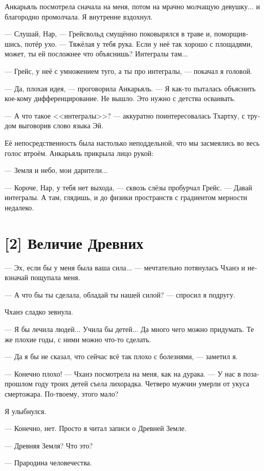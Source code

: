 \documentclass[a4paper,12pt,fleqn]{book}\usepackage{cooltooltips}\usepackage{polyglossia}\setdefaultlanguage[babelshorthands=true]{russian}\setotherlanguage{english}\defaultfontfeatures{Ligatures=TeX,Mapping=tex-text} \usepackage{xcolor}\definecolor{lightgray}{HTML}{bbbbbb}\color{lightgray}\newcommand{\ml}[3]{\textenglish{\textcolor{black}{#3}}}
\begin{document}
{Анкарьяль посмотрела сначала на меня, потом на мрачно молчащую девушку... и благородно промолчала.
Я внутренне вздохнул.

--- Слушай, Нар, --- Грейсвольд смущённо поковырялся в траве и, поморщившись, потёр ухо.
--- Тяжёлая у тебя рука.
Если у неё так хорошо с площадями, может, ты ей посложнее что объяснишь?
Интегралы там...

--- Грейс, у неё с умножением туго, а ты про интегралы, --- покачал я головой.

--- Да, плохая идея, --- проговорила Анкарьяль.
--- Я как-то пыталась объяснить кое-кому дифференцирование.
Не вышло.
Это нужно с детства осваивать.

--- А что такое <<интегралы>>? --- аккуратно поинтересовалась Тхартху, с трудом выговорив слово языка Эй.

Её непосредственность была настолько неподдельной, что мы засмеялись во весь голос втроём.
Анкарьяль прикрыла лицо рукой:

--- Земля и небо, мои дарители...

--- Короче, Нар, у тебя нет выхода, --- сквозь слёзы пробурчал Грейс.
--- Давай интегралы.
А там, глядишь, и до физики пространств с градиентом мерности недалеко.

\section{[2] Величие Древних}

--- Эх, если бы у меня была ваша сила... --- мечтательно потянулась Чханэ и невзначай пощупала меня.

--- А что бы ты сделала, обладай ты нашей силой? --- спросил я подругу.

Чханэ сладко зевнула.

--- Я бы лечила людей... Учила бы детей... Да много чего можно придумать.
Те же плохие годы, с ними можно что-то сделать.

--- Да я бы не сказал, что сейчас всё так плохо с болезнями, --- заметил я.

--- Конечно плохо! --- Чханэ посмотрела на меня, как на дурака.
--- У нас в позапрошлом году троих детей съела лихорадка.
Четверо мужчин умерли от укуса смертожара.
По-твоему, этого мало?

Я улыбнулся.

--- Конечно, нет.
Просто я читал записи о Древней Земле.

--- Древняя Земля?
Что это?

--- Прародина человечества.

}
\end{document}
